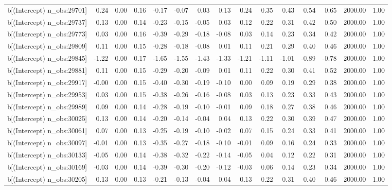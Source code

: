 \begin{table}[ht]
\begin{tabular}{rrrrrrrrrrrrrrr}
  b[(Intercept) n\_obs:29701] & 0.24 & 0.00 & 0.16 & -0.17 & -0.07 & 0.03 & 0.13 & 0.24 & 0.35 & 0.43 & 0.54 & 0.65 & 2000.00 & 1.00 \\ 
  b[(Intercept) n\_obs:29737] & 0.13 & 0.00 & 0.14 & -0.23 & -0.15 & -0.05 & 0.03 & 0.12 & 0.22 & 0.31 & 0.42 & 0.50 & 2000.00 & 1.00 \\ 
  b[(Intercept) n\_obs:29773] & 0.03 & 0.00 & 0.16 & -0.39 & -0.29 & -0.18 & -0.08 & 0.03 & 0.14 & 0.23 & 0.34 & 0.42 & 2000.00 & 1.00 \\ 
  b[(Intercept) n\_obs:29809] & 0.11 & 0.00 & 0.15 & -0.28 & -0.18 & -0.08 & 0.01 & 0.11 & 0.21 & 0.29 & 0.40 & 0.46 & 2000.00 & 1.00 \\ 
  b[(Intercept) n\_obs:29845] & -1.22 & 0.00 & 0.17 & -1.65 & -1.55 & -1.43 & -1.33 & -1.21 & -1.11 & -1.01 & -0.89 & -0.78 & 2000.00 & 1.00 \\ 
  b[(Intercept) n\_obs:29881] & 0.11 & 0.00 & 0.15 & -0.29 & -0.20 & -0.09 & 0.01 & 0.11 & 0.22 & 0.30 & 0.41 & 0.52 & 2000.00 & 1.00 \\ 
  b[(Intercept) n\_obs:29917] & -0.00 & 0.00 & 0.15 & -0.40 & -0.30 & -0.19 & -0.10 & 0.00 & 0.09 & 0.19 & 0.29 & 0.38 & 2000.00 & 1.00 \\ 
  b[(Intercept) n\_obs:29953] & 0.03 & 0.00 & 0.15 & -0.38 & -0.26 & -0.16 & -0.08 & 0.03 & 0.13 & 0.23 & 0.33 & 0.43 & 2000.00 & 1.00 \\ 
  b[(Intercept) n\_obs:29989] & 0.09 & 0.00 & 0.14 & -0.28 & -0.19 & -0.10 & -0.01 & 0.09 & 0.18 & 0.27 & 0.38 & 0.46 & 2000.00 & 1.00 \\ 
  b[(Intercept) n\_obs:30025] & 0.13 & 0.00 & 0.14 & -0.20 & -0.14 & -0.04 & 0.04 & 0.13 & 0.22 & 0.30 & 0.39 & 0.47 & 2000.00 & 1.00 \\ 
  b[(Intercept) n\_obs:30061] & 0.07 & 0.00 & 0.13 & -0.25 & -0.19 & -0.10 & -0.02 & 0.07 & 0.15 & 0.24 & 0.33 & 0.41 & 2000.00 & 1.00 \\ 
  b[(Intercept) n\_obs:30097] & -0.01 & 0.00 & 0.13 & -0.35 & -0.27 & -0.18 & -0.10 & -0.01 & 0.09 & 0.16 & 0.24 & 0.33 & 2000.00 & 1.00 \\ 
  b[(Intercept) n\_obs:30133] & -0.05 & 0.00 & 0.14 & -0.38 & -0.32 & -0.22 & -0.14 & -0.05 & 0.04 & 0.12 & 0.22 & 0.31 & 2000.00 & 1.00 \\ 
  b[(Intercept) n\_obs:30169] & -0.03 & 0.00 & 0.14 & -0.39 & -0.30 & -0.20 & -0.12 & -0.03 & 0.06 & 0.14 & 0.23 & 0.34 & 2000.00 & 1.00 \\ 
  b[(Intercept) n\_obs:30205] & 0.13 & 0.00 & 0.13 & -0.21 & -0.13 & -0.04 & 0.04 & 0.13 & 0.22 & 0.31 & 0.40 & 0.46 & 2000.00 & 1.00 \\ 

\end{tabular}
\end{table}
